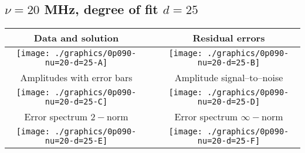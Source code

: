 

% 

\clearpage{}
\break{}

\subsection{$\nu = 20$ MHz, degree of fit $d = 25$}

\begin{table}[h]
    \begin{center}
        \begin{tabular}{ccc}
            Data and solution & \quad & Residual errors \\\hline
            \texttt{[image: ./graphics/0p090-nu=20-d=25-A]} &&
            \texttt{[image: ./graphics/0p090-nu=20-d=25-B]} \\[15pt]
            Amplitudes with error bars && Amplitude signal--to--noise \\\hline
            \texttt{[image: ./graphics/0p090-nu=20-d=25-C]} &&
            \texttt{[image: ./graphics/0p090-nu=20-d=25-D]} \\[15pt]
            Error spectrum $2-$norm && Error spectrum $\infty-$norm \\\hline
            \texttt{[image: ./graphics/0p090-nu=20-d=25-E]} &&
            \texttt{[image: ./graphics/0p090-nu=20-d=25-F]} \\[15pt]
        \end{tabular}
    \end{center}
\label{fig:elev=90, nu=20}
\end{table}



\endinput
